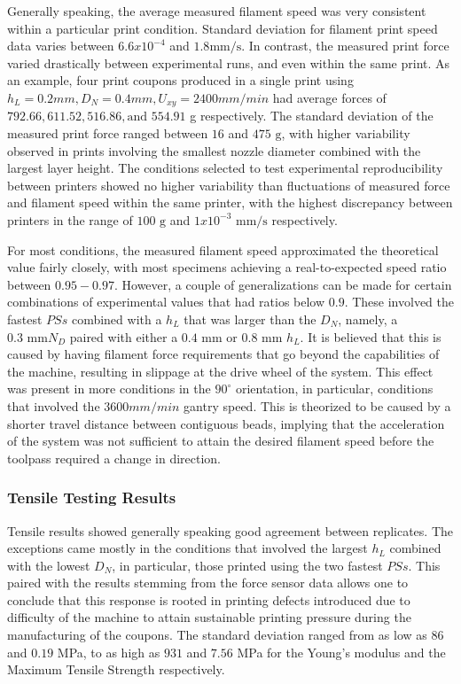 \documentclass[main.tex]{subfiles}
\begin{document}
Generally speaking, the average measured filament speed was very consistent within a particular print condition. Standard deviation for filament print speed data varies between $6.6x10^{-4}$ and $1.8 \text{mm/s}$. In contrast, the measured print force varied drastically between experimental runs, and even within the same print. As an example, four print coupons produced in a single print using $h_{L}= 0.2 mm, D_{N} = 0.4 mm, U_{xy} = 2400 mm/min$ had average forces of $792.66, 611.52, 516.86, \text{and } 554.91$ g respectively. The standard deviation of the measured print force ranged between $16$ and $475\text{ g}$, with higher variability observed in prints involving the smallest nozzle diameter combined with the largest layer height. The conditions selected to test experimental reproducibility between printers showed no higher variability than fluctuations of measured force and filament speed within the same printer, with the highest discrepancy between printers in the range of $100 \text{ g}$ and $1x10^{-3} \text{ mm/s}$ respectively. 

For most conditions, the measured filament speed approximated the theoretical value fairly closely, with most specimens achieving a real-to-expected speed ratio between $0.95-0.97$. However, a couple of generalizations can be made for certain combinations of experimental values that had ratios below $0.9$. These involved the fastest $PSs$ combined with a $h_{L}$ that was larger than the $D_{N}$, namely, a $0.3 \text{ mm} N_{D}$ paired with either a $0.4 \text{ mm}$ or $0.8 \text{ mm}$ $h_{L}$. It is believed that this is caused by having filament force requirements that go beyond the capabilities of the machine, resulting in slippage at the drive wheel of the system. This effect was present in more conditions in the $90^{\circ}$ orientation, in particular, conditions that involved the $3600 mm/min$ gantry speed. This is theorized to be caused by a shorter travel distance between contiguous beads, implying that the acceleration of the system was not sufficient to attain the desired filament speed before the toolpass required a change in direction. 

\subsubsection{Tensile Testing Results}

Tensile results showed generally speaking good agreement between replicates. The exceptions came mostly in the conditions that involved the largest $h_{L}$ combined with the lowest $D_{N}$, in particular, those printed using the two fastest $PSs$. This paired with the results stemming from the force sensor data allows one to conclude that this response is rooted in printing defects introduced due to difficulty of the machine to attain sustainable printing pressure during the manufacturing of the coupons. The standard deviation ranged from as low as $86$ and $0.19$ MPa, to as high as $931$ and $7.56$ MPa for the Young's modulus and the Maximum Tensile Strength respectively.
\end{document}
